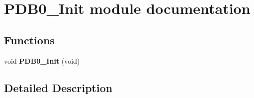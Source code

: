 \hypertarget{group___p_d_b0___init__module}{}\section{P\+D\+B0\+\_\+\+Init module documentation}
\label{group___p_d_b0___init__module}
\subsection*{Functions}
\begin{DoxyCompactItemize}
\item 
void {\bfseries P\+D\+B0\+\_\+\+Init} (void)\hypertarget{group___p_d_b0___init__module_ga81deb0ecb721524a8bc93d717cc94e7a}{}\label{group___p_d_b0___init__module_ga81deb0ecb721524a8bc93d717cc94e7a}

\end{DoxyCompactItemize}


\subsection{Detailed Description}
